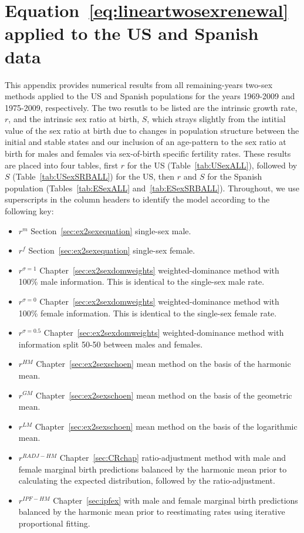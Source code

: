 
\chapter{Equation~\ref{eq:lineartwosexrenewal} applied to the US and Spanish
data}
\label{appendix:exallrestimates}

This appendix provides numerical results from all remaining-years two-sex
methods applied to the US and Spanish populations for the years 1969-2009 and
1975-2009, respectively. The two resutls to be listed are the intrinsic growth
rate, $r$, and the intrinsic sex ratio at birth, $S$, which strays slightly from
the intitial value of the sex ratio at birth due to changes in population
structure between the initial and stable states and our inclusion of an
age-pattern to the sex ratio at birth for males and females via sex-of-birth
specific fertility rates. These results are placed into four tables, first $r$
for the US (Table~\ref{tab:USexALL}), followed by $S$
(Table~\ref{tab:USexSRBALL}) for the US, then $r$ and $S$ for the Spanish
population (Tables~\ref{tab:ESexALL} and~\ref{tab:ESexSRBALL}). Throughout, we
use superscripts in the column headers to identify the model according to the following key:
\begin{itemize}
  \item $r^m$ Section~\ref{sec:ex2sexequation} single-sex male.
  \item $r^f$ Section~\ref{sec:ex2sexequation} single-sex female.
  \item $r^{\sigma=1}$ Chapter~\ref{sec:ex2sexdomweights} weighted-dominance
  method with 100\% male information. This is identical to the single-sex male rate.
  \item $r^{\sigma=0}$ Chapter~\ref{sec:ex2sexdomweights} weighted-dominance
  method with 100\% female information. This is identical to the single-sex female rate.
  \item $r^{\sigma=0.5}$ Chapter~\ref{sec:ex2sexdomweights} weighted-dominance
  method with information split 50-50 between males and females.
  \item $r^{HM}$ Chapter~\ref{sec:ex2sexschoen} mean method on the basis of the
  harmonic mean.
  \item $r^{GM}$ Chapter~\ref{sec:ex2sexschoen} mean method on the basis of
  the geometric mean.
  \item $r^{LM}$ Chapter~\ref{sec:ex2sexschoen} mean method on the basis of
  the logarithmic mean.
  \item $r^{RADJ-HM}$ Chapter~\ref{sec:CRchap} ratio-adjustment method with male
  and female marginal birth predictions balanced by the harmonic mean prior to
  calculating the expected distribution, followed by the ratio-adjustment.
  \item $r^{IPF-HM}$ Chapter~\ref{sec:ipfex} with male and female marginal
  birth predictions balanced by the harmonic mean prior to reestimating rates
  using iterative proportional fitting.
\end{itemize}
